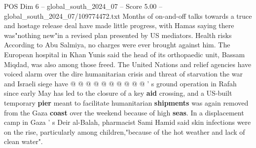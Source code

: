 \begin{textsample}{POS Dim 6 – global\_south\_2024\_07 – Score 5.00 – global\_south\_2024\_07/109774472.txt}
Months of on-and-off talks towards a truce and hostage release deal have made little progress, with Hamas saying there was"nothing new"in a revised plan presented by US mediators.
Health risks According to Abu Salmiya, no charges were ever brought against him.
The European hospital in Khan Yunis said the head of its orthopaedic unit, Bassam Miqdad, was also among those freed.
The United Nations and relief agencies have voiced alarm over the dire humanitarian crisis and threat of starvation the war and Israeli siege have @ @ @ @ @ @ @ @ @ @ ' s ground operation in Rafah since early May has led to the closure of a key \textbf{aid} crossing, and a US-built temporary \textbf{pier} meant to facilitate humanitarian \textbf{shipments} was again removed from the Gaza \textbf{coast} over the weekend because of high \textbf{seas}.
In a displacement camp in Gaza ' s Deir al-Balah, pharmacist Sami Hamid said skin infections were on the rise, particularly among children,"because of the hot weather and lack of clean water".

\end{textsample}

